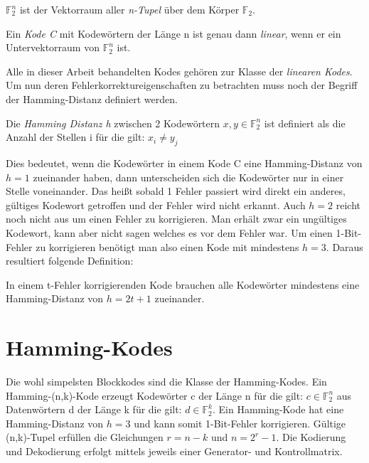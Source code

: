 \begin{t_def}
$\mathbb{F}_{2}^{n}$ ist der Vektorraum aller {\em n-Tupel} über dem Körper $\mathbb{F}_2$.
\end{t_def}


\begin{t_def}
Ein {\em Kode C} mit Kodewörtern der Länge n ist genau dann {\em linear}, wenn er ein Untervektorraum von $\mathbb{F}_{2}^{n}$ ist.
\end{t_def}

Alle in dieser Arbeit behandelten Kodes gehören zur Klasse der \textit{linearen Kodes}.\cite[Kap. 1.2]{huffman2010fundamentals} Um nun deren Fehlerkorrektureigenschaften zu betrachten muss noch der Begriff der Hamming-Distanz definiert werden.

\begin{t_def}
Die {\em Hamming Distanz h} zwischen 2 Kodewörtern $x,y \in \mathbb{F}_{2}^{n}$ ist definiert als die Anzahl der Stellen i für die gilt: $x_i \neq y_j$
\end{t_def}

Dies bedeutet, wenn die Kodewörter in einem Kode C eine Hamming-Distanz von $h=1$ zueinander haben, dann unterscheiden sich die Kodewörter nur in einer Stelle voneinander. Das heißt sobald 1 Fehler passiert wird direkt ein anderes, gültiges Kodewort getroffen und der Fehler wird nicht erkannt. Auch $h=2$ reicht noch nicht aus um einen Fehler zu korrigieren. Man erhält zwar ein ungültiges Kodewort, kann aber nicht sagen welches es vor dem Fehler war. Um einen 1-Bit-Fehler zu korrigieren benötigt man also einen Kode mit mindestens $h=3$.\cite[Kap. 1.4]{huffman2010fundamentals} Daraus resultiert folgende Definition:

\begin{t_def}
In einem t-Fehler korrigierenden Kode brauchen alle Kodewörter mindestens eine Hamming-Distanz von $h=2t+1$ zueinander.
\end{t_def}


\section{Hamming-Kodes}
\label{section:hamming}

Die wohl simpelsten Blockkodes sind die Klasse der Hamming-Kodes. Ein Hamming-(n,k)-Kode erzeugt Kodewörter c der Länge n für die gilt: $c \in \mathbb{F}_{2}^{n}$ aus Datenwörtern d der Länge k für die gilt: $d \in \mathbb{F}_{2}^{k}$. Ein Hamming-Kode hat eine Hamming-Distanz von $h=3$ und kann somit 1-Bit-Fehler korrigieren. Gültige (n,k)-Tupel erfüllen die Gleichungen $r = n - k$ und $n = 2^r - 1$.\cite[Kap. 1.8]{huffman2010fundamentals} Die Kodierung und Dekodierung erfolgt mittels jeweils einer Generator- und Kontrollmatrix.

